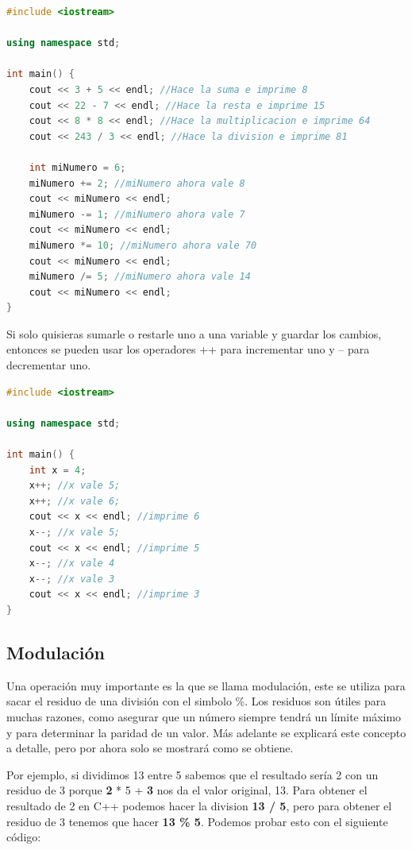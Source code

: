\documentclass{article}
\begin{document}
\begin{lstlisting}[language=C++, title=Operaciones basicas]
#include <iostream>

using namespace std;

int main() {
	cout << 3 + 5 << endl; //Hace la suma e imprime 8
	cout << 22 - 7 << endl; //Hace la resta e imprime 15
	cout << 8 * 8 << endl; //Hace la multiplicacion e imprime 64
	cout << 243 / 3 << endl; //Hace la division e imprime 81

	int miNumero = 6;
	miNumero += 2; //miNumero ahora vale 8
	cout << miNumero << endl;
	miNumero -= 1; //miNumero ahora vale 7
	cout << miNumero << endl;
	miNumero *= 10; //miNumero ahora vale 70
	cout << miNumero << endl;
	miNumero /= 5; //miNumero ahora vale 14
	cout << miNumero << endl;
}
\end{lstlisting}

Si solo quisieras sumarle o restarle uno a una variable y guardar los cambios, entonces se pueden usar los operadores ++ para incrementar uno y -- para decrementar uno.

\begin{lstlisting}[language=C++, title=Incrementos y decrementos]
#include <iostream>

using namespace std;

int main() {
	int x = 4;
	x++; //x vale 5;
	x++; //x vale 6;
	cout << x << endl; //imprime 6
	x--; //x vale 5;
	cout << x << endl; //imprime 5
	x--; //x vale 4
	x--; //x vale 3
	cout << x << endl; //imprime 3
}
\end{lstlisting}

\subsection{Modulación}

Una operación muy importante es la que se llama modulación, este se utiliza para sacar el residuo de una división con el simbolo \%. Los residuos son útiles para muchas razones, como asegurar que un número siempre tendrá un límite máximo y para determinar la paridad de un valor. Más adelante se explicará este concepto a detalle, pero por ahora solo se mostrará como se obtiene.

Por ejemplo, si dividimos 13 entre 5 sabemos que el resultado sería 2 con un residuo de 3 porque \textbf{2} * 5 + \textbf{3} nos da el valor original, 13. Para obtener el resultado de 2 en C++ podemos hacer la division \textbf{13 / 5}, pero para obtener el residuo de 3 tenemos que hacer \textbf{13 \% 5}. Podemos probar esto con el siguiente código:
\end{document}

